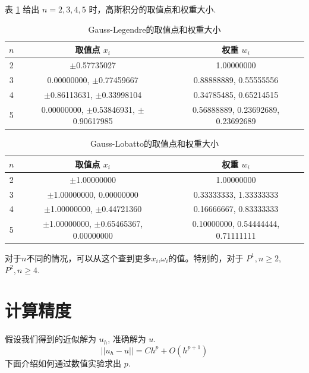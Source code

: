 \documentclass{article}
\numberwithin{equation}{subsection}    %
\begin{document}
\begin{appendix}
    表 \ref{tab:Gauss-Legendre积分} 给出 $n=2,3,4,5$ 时，高斯积分的取值点和权重大小.
    \begin{table}[ht]
        \centering
        \caption{Gauss-Legendre的取值点和权重大小}
        \label{tab:Gauss-Legendre积分}
        \begin{tabular}{ccc}
            \toprule
            $n$ & 取值点 $x_i$                                 & 权重 $w_i$                         \\
            \midrule
            2   & $\pm$0.57735027                              & 1.00000000                         \\
            3   & 0.00000000, $\pm$0.77459667                  & 0.88888889, 0.55555556             \\
            4   & $\pm$0.86113631, $\pm$0.33998104             & 0.34785485, 0.65214515             \\
            5   & 0.00000000, $\pm$0.53846931, $\pm$0.90617985 & 0.56888889, 0.23692689, 0.23692689 \\
            \bottomrule
        \end{tabular}
    \end{table}

    \begin{table}[ht]
        \centering
        \caption{Gauss-Lobatto的取值点和权重大小}
        \label{tab:Gauss-Lobatto积分}
        \begin{tabular}{ccc}
            \toprule
            $n$ & 取值点 $x_i$                                 & 权重 $w_i$                         \\
            \midrule
            2   & $\pm$1.00000000                              & 1.00000000                         \\
            3   & $\pm$1.00000000, 0.00000000                  & 0.33333333, 1.33333333             \\
            4   & $\pm$1.00000000, $\pm$0.44721360             & 0.16666667, 0.83333333             \\
            5   & $\pm$1.00000000, $\pm$0.65465367, 0.00000000 & 0.10000000, 0.54444444, 0.71111111 \\
            \bottomrule
        \end{tabular}
    \end{table}
    对于$n$不同的情况，可以从这个\cite{RN106}查到更多$x_i$,$\omega_i$的值。特别的，对于 $P^1,n\geqslant 2$,$P^2,n\geqslant 4$.
    \section{计算精度}
    假设我们得到的近似解为 $u_h$, 准确解为 $u$.
    \begin{equation}
        || u_h-u || = Ch^p + O(h^{p+1})
    \end{equation}
    下面介绍如何通过数值实验求出 $p$.


\end{appendix}
\end{document}
